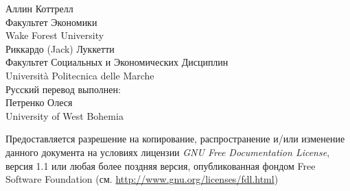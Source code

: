 \documentclass[oneside]{book}
\begin{document}
\VerbatimFootnotes
\setlength{\parindent}{0pt}
\setlength{\parskip}{1ex}
\setcounter{tocdepth}{1}


\thispagestyle{empty}

\begin{center}



{\large \sffamily
Аллин Коттрелл\\
Факультет Экономики\\
Wake Forest University\\

\vspace{20pt}
Риккардо (Jack) Луккетти\\
Факультет Социальных и Экономических Дисциплин\\
Universit\`a Politecnica delle Marche\\

\vspace{20pt}
Русский перевод выполнен:\\
Петренко Олеся\\
University of West Bohemia\\
\vspace{20pt}

}

\end{center}
\clearpage


\thispagestyle{empty}


\vspace*{2in}

Предоставляется разрешение на копирование, распространение и/или
изменение данного документа на условиях лицензии \emph{GNU Free
  Documentation License}, версия 1.1 или любая более поздняя версия,
опубликованная фондом Free Software Foundation
(см. \url{http://www.gnu.org/licenses/fdl.html})

\cleardoublepage


\pagestyle{headings}

\tableofcontents

\clearpage
{}
\end{document}
